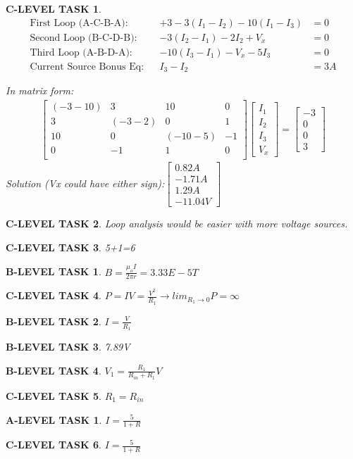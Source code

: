 \documentclass{book}
\numberwithin{equation}{section}
\newtheorem{alevel}{A-LEVEL TASK}
\newtheorem{blevel}{B-LEVEL TASK}
\newtheorem{clevel}{C-LEVEL TASK}
\theoremstyle{definition}
\begin{document}
\begin{clevel} 
\begin{align*}
\text{First Loop (A-C-B-A):}&&+3-3(I_1-I_2)-10(I_1-I_3)&=0\\
\text{Second Loop (B-C-D-B):}&&-3(I_2-I_1)-2I_2+V_x&=0\\
\text{Third Loop (A-B-D-A):}&&-10(I_3-I_1)-V_x-5I_3&=0\\
\text{Current Source Bonus Eq:}&&I_3-I_2&=3A
\end{align*}

In matrix form:
\begin{align}
\left[ \begin{matrix}
(-3-10)&3&10&0\\3&(-3-2)&0&1\\10&0&(-10-5)&-1\\0&-1&1&0\\
\end{matrix} \right]
\left[ \begin{matrix}I_1\\I_2\\I_3\\V_x\end{matrix} \right] =
\left[ \begin{matrix}-3\\0\\0\\3\end{matrix} \right]
\end{align}
Solution (Vx could have either sign):$\left[ \begin{matrix}0.82A\\-1.71A\\1.29A\\-11.04V\end{matrix} \right]$
\end{clevel}

\begin{clevel} Loop analysis would be easier with more voltage sources. \end{clevel}
\begin{clevel} 5+1=6 \end{clevel}
\begin{blevel} $B=\frac{\mu_o I}{2\pi r}=3.33E-5 T$ \end{blevel}
\begin{clevel} $P=IV=\frac{V^2}{R_1} \rightarrow lim_{R_1 \rightarrow 0}P=\infty$ \end{clevel}
\begin{blevel} $I=\frac{V}{R_1}$\end{blevel}
\begin{blevel} 7.89V\end{blevel}
\begin{blevel} $V_1=\frac{R_1}{R_{in}+R_1}V$\end{blevel}
\begin{clevel} $R_1=R_{in}$\end{clevel}
\begin{alevel} $I=\frac{5}{1+R}$\end{alevel}
\begin{clevel} $I=\frac{5}{1+R}$\end{clevel}
\end{document}
